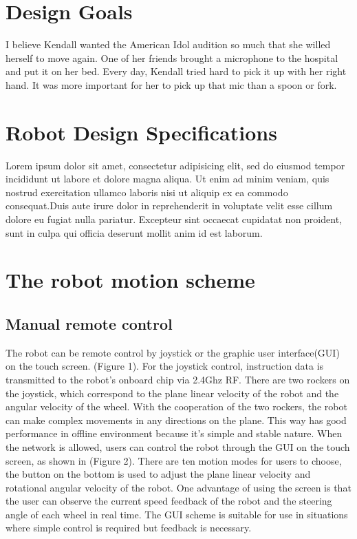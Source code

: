 \documentclass[twocolumn]{article}
\begin{document}
    \section{Design Goals}
    I believe Kendall wanted the American Idol audition so much that she willed herself to move again. One of her friends brought a microphone to the hospital and put it on her bed. Every day, Kendall tried hard to pick it up with her right hand. It was more important for her to pick up that mic than a spoon or fork.
    
    \section{Robot Design Specifications}
        Lorem ipsum dolor sit amet, consectetur adipisicing elit, sed do eiusmod
        tempor incididunt ut labore et dolore magna aliqua. Ut enim ad minim veniam,
        quis nostrud exercitation ullamco laboris nisi ut aliquip ex ea commodo
        consequat.Duis aute irure dolor in reprehenderit in voluptate velit esse
        cillum dolore eu fugiat nulla pariatur. Excepteur sint occaecat cupidatat non
        proident, sunt in culpa qui officia deserunt mollit anim id est laborum.
    
    \section{The robot motion scheme}
    \subsection{Manual remote control}
    The robot can be remote control by joystick or the graphic user interface(GUI) on the touch screen. 
    (Figure 1). For the joystick control, instruction data is transmitted to the robot’s onboard chip via 
    2.4Ghz RF. There are two rockers on the joystick, which correspond to the plane linear velocity of 
    the robot and the angular velocity of the wheel. With the cooperation of the two rockers, the robot 
    can make complex movements in any directions on the plane. This way has good performance in offline 
    environment because it’s simple and stable nature. When the network is allowed, users can control the 
    robot through the GUI on the touch screen, as shown in (Figure 2). There are ten motion modes for 
    users to choose, the button on the bottom is used to adjust the plane linear velocity and rotational 
    angular velocity of the robot. One advantage of using the screen is that the user can observe the 
    current speed feedback of the robot and the steering angle of each wheel in real time. The GUI scheme 
    is suitable for use in situations where simple control is required but feedback is necessary.
\end{document}
